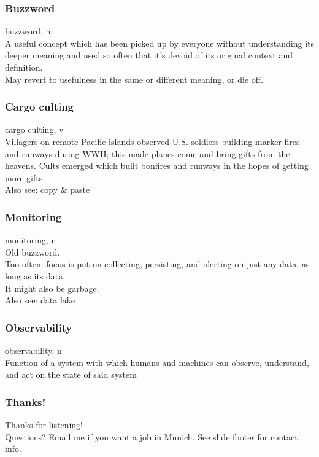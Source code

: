 \documentclass[t]{beamer}
\begin{document}
\begin{frame}
	\frametitle{Buzzword}
	\begin{center}
		\vfill
		buzzword, n:\\
		A useful concept which has been picked up by everyone without understanding its deeper meaning and used so often that it's devoid of its original context and definition.\\
		May revert to usefulness in the same or different meaning, or die off.
		\vfill
	\end{center}
\end{frame}

\begin{frame}
	\frametitle{Cargo culting}
	\begin{center}
		\vfill
		cargo culting, v\\
		Villagers on remote Pacific islands observed U.S. soldiers building marker fires and runways during WWII; this made planes come and bring gifts from the heavens.
		Cults emerged which built bonfires and runways in the hopes of getting more gifts.\\
		Also see: copy \& paste
		\vfill
	\end{center}
\end{frame}

\begin{frame}
	\frametitle{Monitoring}
	\begin{center}
		\vfill
		monitoring, n\\
		Old buzzword.\\
		Too often: focus is put on collecting, persisting, and alerting on just any data, as long as its data.\\
		It might also be garbage.\\
		Also see: data lake
		\vfill
	\end{center}
\end{frame}

\begin{frame}
	\frametitle{Observability}
	\begin{center}
		\vfill
		observability, n\\
		Function of a system with which humans and machines can observe, understand, and act on the state of said system
		\vfill
	\end{center}
\end{frame}

\begin{frame}
	\frametitle{Thanks!}
	\begin{center}
		\vfill
		Thanks for listening!\\
		\vfill
		Questions?
		\vfill
		Email me if you want a job in Munich.
		\vfill
		See slide footer for contact info.
		\vfill
	\end{center}
\end{frame}
\end{document}
